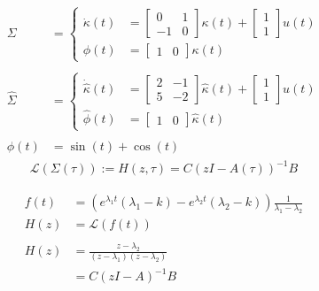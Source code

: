 \documentclass[11 pt]{article}
\newcommand{\1}{\mathbbm{1}}
\begin{document}
       \begin{align*}
         \Sigma &= \left\{ \begin{array}{ll}
           \dot{\kappa}(t) &= \left[ \begin{array}{cc} 0 & 1 \\ -1 & 0 \end{array} \right] \kappa(t) + \left[ \begin{array}{c} 1 \\ 1 \end{array}\right] u(t) \\
             \phi(t) &= \left[ \begin{array}{cc} 1 & 0 \end{array} \right] \kappa(t)
         \end{array} \right. \\ \\
         \widehat{\Sigma} &= \left\{ \begin{array}{ll}
           \dot{\widehat{\kappa}}(t) &= \left[ \begin{array}{cc} 2 & -1 \\ 5 & -2 \end{array} \right] \widehat{\kappa}(t) + \left[ \begin{array}{c} 1 \\ 1 \end{array}\right] u(t) \\
             \widehat{\phi}(t) &= \left[ \begin{array}{cc} 1 & 0 \end{array} \right] \widehat{\kappa}(t)
         \end{array} \right. \\ \\
         \phi(t) &= \sin(t) + \cos(t)
    \end{align*}
    \begin{align*}
      \mathcal{L}(\Sigma(\tau)) := H(z, \tau) = C \left(zI - A(\tau) \right)^{-1} B
    \end{align*}
    
    \begin{align*}
      f(t) &= \left( e^{\lambda_{1} t} \left(\lambda_{1} - k\right) - e^{\lambda_{2}t}\left(\lambda_{2} - k \right) \right) \frac{1}{\lambda_{1}-\lambda_{2}} \\
        H(z) &= \mathcal{L}\left(f(t)\right) \\ \\
        H(z) &= \frac{z - \lambda_{2}}{\left(z -\lambda_{1} \right)\left(z - \lambda_{2} \right)} \\
        &= C( zI - A)^{-1}B
    \end{align*}
\end{document}
